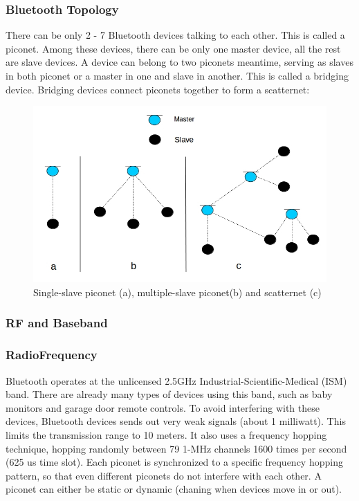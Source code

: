 \subsubsection{Bluetooth Topology}
There can be only 2 - 7 Bluetooth devices talking to each other. This is called a piconet. Among these devices, there can be only one master device, all the rest are slave devices. A device can belong to two piconets meantime, serving as slaves in both piconet or a master in one and slave in another. This is called a bridging device. Bridging devices connect piconets together to form a scatternet:\cite{bluetooth2}
\begin{figure}[htp]
\center
\includegraphics[scale=0.5]{topology.jpg} 
\caption{Single-slave piconet (a), multiple-slave piconet(b) and scatternet (c)}
\end{figure}
\subsubsection{RF and Baseband}
\subsubsection*{RadioFrequency}
Bluetooth operates at the unlicensed 2.5GHz Industrial-Scientific-Medical (ISM) band. There are already many types of devices using this band, such as baby monitors and garage door remote controls. To avoid interfering with these devices, Bluetooth devices sends out very weak signals (about 1 milliwatt). This limits the transmission range to 10 meters. It also uses a frequency hopping technique, hopping randomly between 79 1-MHz channels 1600 times per second (625 us time slot). Each piconet is synchronized to a specific frequency hopping pattern\cite{bluetooth2}, so that even different piconets do not interfere with each other. A piconet can either be static or dynamic (chaning when devices move in or out).
